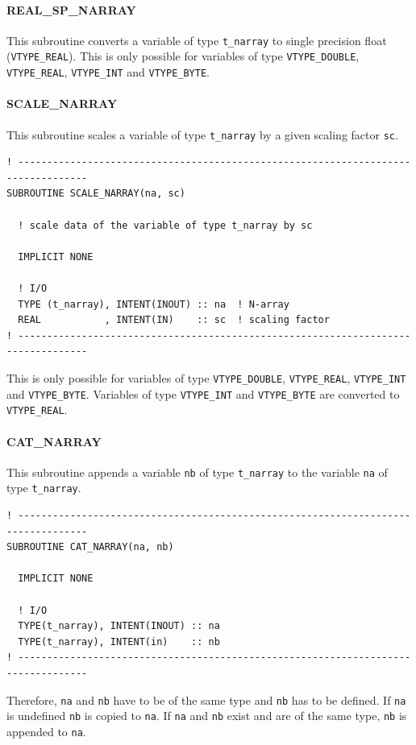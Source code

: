 \documentclass[11pt,twoside]{article}
\begin{document}
\paragraph{REAL\_SP\_NARRAY\\\label{SPARRAY}}
This subroutine converts a variable of type \verb|t_narray|
 to single precision float (\verb|VTYPE_REAL|). This is only possible for
 variables of type \verb|VTYPE_DOUBLE|, \verb|VTYPE_REAL|, \verb|VTYPE_INT|
and   \verb|VTYPE_BYTE|.
\paragraph{SCALE\_NARRAY\\ \label{SCALEARRAY}}
This subroutine scales a variable of type \verb|t_narray| by a given
scaling factor \verb|sc|.
\begin{verbatim}
! ----------------------------------------------------------------------------------
SUBROUTINE SCALE_NARRAY(na, sc)

  ! scale data of the variable of type t_narray by sc

  IMPLICIT NONE

  ! I/O
  TYPE (t_narray), INTENT(INOUT) :: na  ! N-array
  REAL           , INTENT(IN)    :: sc  ! scaling factor
! ----------------------------------------------------------------------------------
\end{verbatim}
 This is only possible for
 variables of type \verb|VTYPE_DOUBLE|, \verb|VTYPE_REAL|, \verb|VTYPE_INT|
and   \verb|VTYPE_BYTE|. Variables of type \verb|VTYPE_INT|
and   \verb|VTYPE_BYTE| are converted to \verb|VTYPE_REAL|.

\paragraph{CAT\_NARRAY\\\label{CATARRAY}}
This subroutine appends a variable  \verb|nb| of type \verb|t_narray| 
to the variable \verb|na| of type \verb|t_narray|.

\begin{verbatim}
! ----------------------------------------------------------------------------------
SUBROUTINE CAT_NARRAY(na, nb)

  IMPLICIT NONE

  ! I/O
  TYPE(t_narray), INTENT(INOUT) :: na
  TYPE(t_narray), INTENT(in)    :: nb
! ----------------------------------------------------------------------------------
\end{verbatim}
Therefore, \verb|na| and \verb|nb| have to be of the same type
and \verb|nb| has to be defined. If \verb|na| is undefined \verb|nb| is
copied to \verb|na|.
If \verb|na| and \verb|nb| exist and are of the same type, \verb|nb| is 
appended to \verb|na|.
\end{document}
